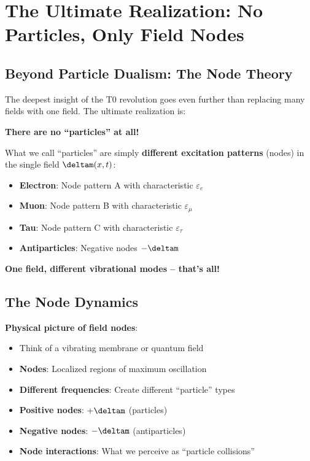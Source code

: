 	\section{The Ultimate Realization: No Particles, Only Field Nodes}
	
	\subsection{Beyond Particle Dualism: The Node Theory}
	
	The deepest insight of the T0 revolution goes even further than replacing many fields with one field. The ultimate realization is:
	
	\begin{tcolorbox}[colback=purple!5!white,colframe=purple!75!black,title=Ultimate Truth: No Separate Particles]
		\textbf{There are no ``particles'' at all!}
		
		What we call ``particles'' are simply \textbf{different excitation patterns} (nodes) in the single field $\deltam(x,t)$:
		
		\begin{itemize}
			\item \textbf{Electron}: Node pattern A with characteristic $\varepsilon_e$
			\item \textbf{Muon}: Node pattern B with characteristic $\varepsilon_{\mu}$
			\item \textbf{Tau}: Node pattern C with characteristic $\varepsilon_{\tau}$
			\item \textbf{Antiparticles}: Negative nodes $-\deltam$
		\end{itemize}
		
		\textbf{One field, different vibrational modes -- that's all!}
	\end{tcolorbox}
	
	\subsection{The Node Dynamics}
	
	\textbf{Physical picture of field nodes}:
	\begin{itemize}
		\item Think of a vibrating membrane or quantum field
		\item \textbf{Nodes}: Localized regions of maximum oscillation
		\item \textbf{Different frequencies}: Create different ``particle'' types
		\item \textbf{Positive nodes}: $+\deltam$ (particles)
		\item \textbf{Negative nodes}: $-\deltam$ (antiparticles)
		\item \textbf{Node interactions}: What we perceive as ``particle collisions''
	\end{itemize}
	
